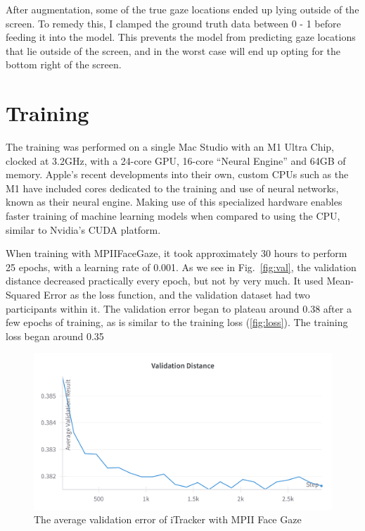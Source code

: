 \documentclass{report}
\begin{document}
After augmentation, some of the true gaze locations ended up lying outside of the screen. To remedy this, I clamped the ground truth data between 0 - 1 before feeding it into the model. This prevents the model from predicting gaze locations that lie outside of the screen, and in the worst case will end up opting for the bottom right of the screen. 

\section{Training}
\label{sec:training}

The training was performed on a single Mac Studio with an M1 Ultra Chip, clocked at 3.2GHz, with a 24-core GPU, 16-core ``Neural Engine'' and 64GB of memory. Apple's recent developments into their own, custom CPUs such as the M1 have included cores dedicated to the training and use of neural networks, known as their neural engine. Making use of this specialized hardware enables faster training of machine learning models when compared to using the CPU, similar to Nvidia's CUDA platform. 

When training with MPIIFaceGaze, it took approximately 30 hours to perform 25 epochs, with a learning rate of 0.001. As we see in Fig.~\ref{fig:val}, the validation distance decreased practically every epoch, but not by very much. It used Mean-Squared Error as the loss function, and the validation dataset had two participants within it. The validation error began to plateau around 0.38 after a few epochs of training, as is similar to the training loss (\autoref{fig:loss}). The training loss began around 0.35 

\begin{figure}
    \begin{center}
        \includegraphics[scale=0.1]{../assets/Validation Distance.png}
    \end{center}
    \caption{The average validation error of iTracker with MPII Face Gaze}
    \label{fig:loss}
\end{figure}
\end{document}
